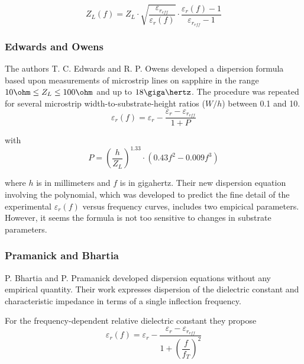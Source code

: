 \documentclass[10pt]{report}
\begin{document}
\begin{equation}
Z_{L}(f) = Z_{L}\cdot\sqrt{\frac{\varepsilon_{r_{eff}}}{\varepsilon_{r}(f)}}\cdot\frac{\varepsilon_{r}(f) - 1}{\varepsilon_{r_{eff}} - 1}
\end{equation}

\subsubsection{Edwards and Owens}

The authors T. C. Edwards and R. P. Owens \cite{Edwards2} developed a
dispersion formula based upon measurements of microstrip lines on
sapphire in the range $10\ohm \le Z_L \le 100\ohm$ and up to
$18\giga\hertz$.  The procedure was repeated for several microstrip
width-to-substrate-height ratios ($W/h$) between 0.1 and 10.
\begin{equation}
\varepsilon_{r}(f) = \varepsilon_{r} - \dfrac{\varepsilon_{r} - \varepsilon_{r_{eff}}}{1 + P}
\end{equation}

with
\begin{equation}
P = \left(\dfrac{h}{Z_{L}}\right)^{1.33}\cdot\left(0.43 f^2 - 0.009 f^3\right)
\end{equation}

where $h$ is in millimeters and $f$ is in gigahertz.  Their new
dispersion equation involving the polynomial, which was developed to
predict the fine detail of the experimental $\varepsilon_{r}(f)$
versus frequency curves, includes two empicical parameters.  However,
it seems the formula is not too sensitive to changes in substrate
parameters.

\subsubsection{Pramanick and Bhartia}

P. Bhartia and P. Pramanick \cite{Pramanick1} developed dispersion
equations without any empirical quantity.  Their work expresses
dispersion of the dielectric constant and characteristic impedance in
terms of a single inflection frequency.

\addvspace{12pt}

For the frequency-dependent relative dielectric constant they propose
\begin{equation}
\varepsilon_{r}(f) = \varepsilon_{r} - \dfrac{\varepsilon_{r} - \varepsilon_{r_{eff}}}{1 + \left(\dfrac{f}{f_T}\right)^2}
\end{equation}
\end{document}
